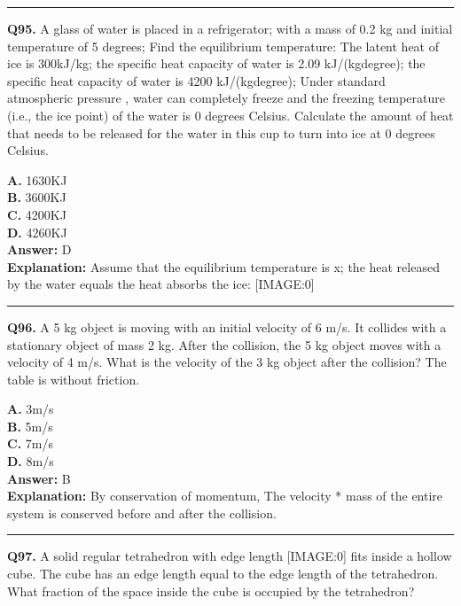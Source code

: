 \documentclass[12pt]{article}
\begin{document}
\hrule
\vspace{1em}


\noindent
\textbf{Q95.} A glass of water is placed in a refrigerator; with a mass of 0.2 kg and initial temperature of 5 degrees; Find the equilibrium temperature: The latent heat of ice is 300kJ/kg; the specific heat capacity of water is 2.09 kJ/(kg\cdot degree); the specific heat capacity of water is 4200 kJ/(kg\cdot degree); Under standard atmospheric pressure , water can completely freeze and the freezing temperature (i.e., the ice point) of the water is 0 degrees Celsius.
Calculate the amount of heat that needs to be released for the water in this cup to turn into ice at 0 degrees Celsius.



\textbf{A.} 1630KJ \\
\textbf{B.} 3600KJ \\
\textbf{C.} 4200KJ \\
\textbf{D.} 4260KJ \\

\textbf{Answer:} D \\
\textbf{Explanation:} Assume that the equilibrium temperature is x; the heat released by the water equals the heat absorbs the ice:
[IMAGE:0]

\hrule
\vspace{1em}


\noindent
\textbf{Q96.} A 5 kg object is moving with an initial velocity of 6 m/s. It collides with a stationary object of mass 2 kg. After the collision, the 5 kg object moves with a velocity of 4 m/s. What is the velocity of the 3 kg object after the collision? The table is without friction.



\textbf{A.} 3m/s \\
\textbf{B.} 5m/s \\
\textbf{C.} 7m/s \\
\textbf{D.} 8m/s \\

\textbf{Answer:} B \\
\textbf{Explanation:} By conservation of momentum, The velocity * mass of the entire system is conserved before and after the collision.

\hrule
\vspace{1em}


\noindent
\textbf{Q97.} A solid regular tetrahedron with edge length
[IMAGE:0]
fits inside a hollow cube. The cube has an edge length equal to the edge length of the tetrahedron. What fraction of the space inside the cube is occupied by the tetrahedron?
\end{document}
